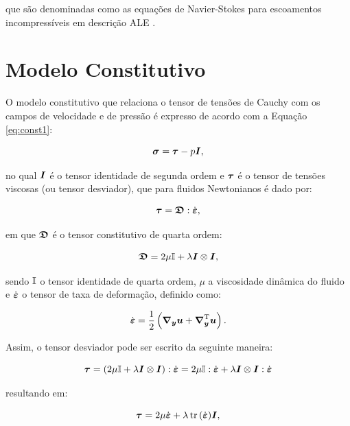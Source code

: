 \noindent que são denominadas como as equações de Navier-Stokes para escoamentos incompressíveis em descrição ALE \cite{bazilevs2013computational}.

\section{Modelo Constitutivo} \label{MC}

O modelo constitutivo que relaciona o tensor de tensões de Cauchy com os campos de velocidade e de pressão é expresso de acordo com a Equação \eqref{eq:const1}:

\begin{equation}
    \boldsymbol{\sigma}=\boldsymbol{\tau}-p\boldsymbol{I}\text{,}\label{eq:const1}
\end{equation}

\noindent no qual $\boldsymbol{I}$ é o tensor identidade de segunda ordem e $\boldsymbol{\tau}$ é o tensor de tensões viscosas (ou tensor desviador), que para fluidos Newtonianos é dado por:

\begin{equation}
    \boldsymbol{\tau}=\boldsymbol{\mathfrak{D}}:\dot{\boldsymbol{\varepsilon}}\text{,}
\end{equation}

\noindent em que $\boldsymbol{\mathfrak{D}}$ é o tensor constitutivo de quarta ordem:

\begin{equation}
    \boldsymbol{\mathfrak{D}}=2\mu\boldsymbol{\mathbb{I}}+\lambda\boldsymbol{I}\otimes\boldsymbol{I}\text{,}
\end{equation}

\noindent sendo $\boldsymbol{\mathbb{I}}$ o tensor identidade de quarta ordem, $\mu$ a viscosidade dinâmica do fluido e $\dot{\boldsymbol{\varepsilon}}$ o tensor de taxa de deformação, definido como:

\begin{equation}
    \dot{\boldsymbol{\varepsilon}}=\frac{1}{2}\left({\boldsymbol{\nabla_y}\boldsymbol{u}+\boldsymbol{\nabla}^{\mathrm{T}}_{\boldsymbol{y}}\boldsymbol{u}}\right)\text{.}\label{eq:deftax1}
\end{equation}

Assim, o tensor desviador pode ser escrito da seguinte maneira:

\[
    \boldsymbol{\tau}=(2\mu\boldsymbol{\mathbb{I}}+\lambda\boldsymbol{I}\otimes\boldsymbol{I}):\dot{\boldsymbol{\varepsilon}}=2\mu\boldsymbol{\mathbb{I}}:\dot{\boldsymbol{\varepsilon}}+\lambda\boldsymbol{I}\otimes\boldsymbol{I}:\dot{\boldsymbol{\varepsilon}}
\]

\noindent resultando em:

\begin{equation}
    \boldsymbol{\tau}=2\mu\dot{\boldsymbol{\varepsilon}}+\lambda\mathop{\mathrm{tr}}\nolimits{(\dot{\boldsymbol{\varepsilon}})}\boldsymbol{I}\text{,}
\end{equation}

